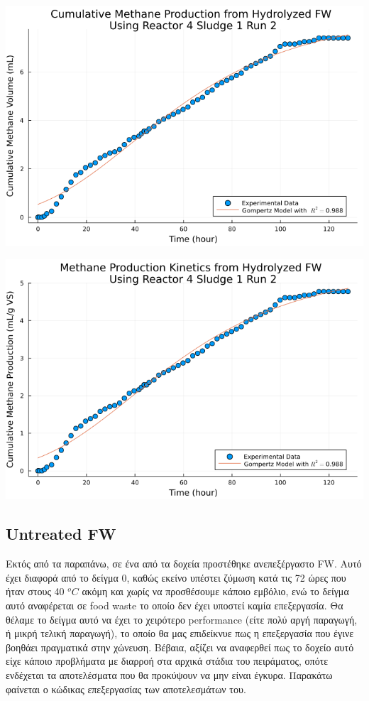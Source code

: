 \documentclass[11pt]{article}
\begin{document}
\begin{center}
\includegraphics[width=.9\linewidth]{../plots/BMPs/Hydrolyzed FW/methane_kinetics_hydrolysate_4_s1_r2_hour.png}
\end{center}

\begin{center}
\includegraphics[width=.9\linewidth]{../plots/BMPs/Hydrolyzed FW/specific_methane_kinetics_hydrolysate_4_s1_r2_hour.png}
\end{center}

\subsection{Untreated FW}
\label{sec:org1f43219}
Εκτός από τα παραπάνω, σε ένα από τα δοχεία προστέθηκε ανεπεξέργαστο FW. Αυτό έχει διαφορά από το δείγμα 0, καθώς εκείνο υπέστει ζύμωση κατά τις 72 ώρες που ήταν στους 40 \(^oC\) ακόμη και χωρίς να προσθέσουμε κάποιο εμβόλιο, ενώ το δείγμα αυτό αναφέρεται σε food waste το οποίο δεν έχει υποστεί καμία επεξεργασία. Θα θέλαμε το δείγμα αυτό να έχει το χειρότερο performance (είτε πολύ αργή παραγωγή, ή μικρή τελική παραγωγή), το οποίο θα μας επιδείκνυε πως η επεξεργασία που έγινε βοηθάει πραγματικά στην χώνευση. Βέβαια, αξίζει να αναφερθεί πως το δοχείο αυτό είχε κάποιο προβλήματα με διαρροή στα αρχικά στάδια του πειράματος, οπότε ενδέχεται τα αποτελέσματα που θα προκύψουν να μην είναι έγκυρα. Παρακάτω φαίνεται ο κώδικας επεξεργασίας των αποτελεσμάτων του.
\end{document}
